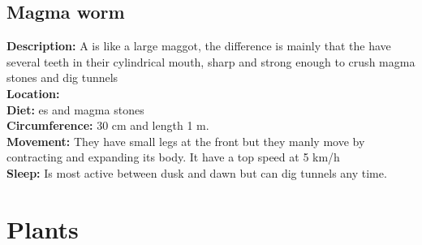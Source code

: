 \documentclass{article}
\begin{document}
\subsection{Magma worm}
\label{worms}

\textbf{Description: } A  is like a large maggot, the difference is mainly that the  have several teeth in their cylindrical mouth, sharp and strong enough to crush magma stones and dig tunnels 
\\\textbf{Location: }
\\\textbf{Diet: }es and magma stones
\\\textbf{Circumference: } 30 cm and length 1 m.
\\\textbf{Movement: } They have small legs at the front but they manly move by contracting and expanding its body. It have a top speed at 5 km/h
\\\textbf{Sleep: } Is most active between dusk and dawn but can dig tunnels any time.

\section{Plants}%
\end{document}
